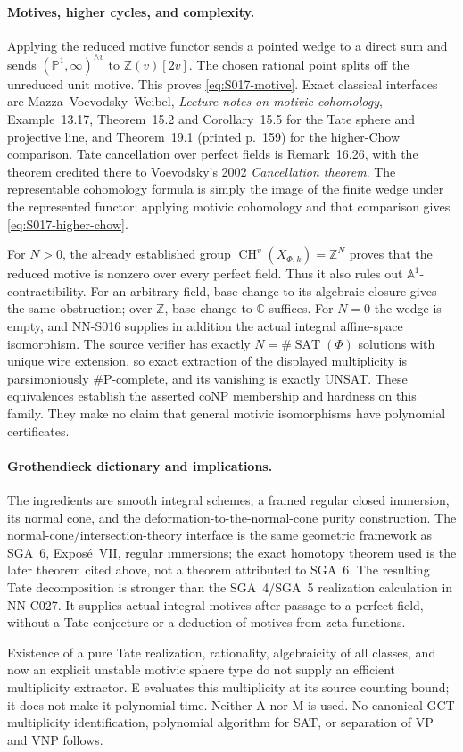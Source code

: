 \paragraph{Motives, higher cycles, and complexity.}
Applying the reduced motive functor sends a pointed wedge to a direct
sum and sends $(\mathbb P^1,\infty)^{\wedge v}$ to
$\mathbb Z(v)[2v]$. The chosen rational point splits off the unreduced
unit motive. This proves \eqref{eq:S017-motive}. Exact classical
interfaces are Mazza--Voevodsky--Weibel, \emph{Lecture notes on motivic
cohomology}, Example~13.17, Theorem~15.2 and Corollary~15.5 for the
Tate sphere and projective line, and Theorem~19.1 (printed p.~159) for
the higher-Chow comparison. Tate cancellation over perfect fields is
Remark~16.26, with the theorem credited there to Voevodsky's 2002
\emph{Cancellation theorem}. The representable cohomology formula is
simply the image of the finite wedge under the represented functor;
applying motivic cohomology and that comparison gives
\eqref{eq:S017-higher-chow}.

For $N>0$, the already established group
$\operatorname{CH}^v(X_{\Phi,k})=\mathbb Z^N$ proves that the reduced
motive is nonzero over every perfect field. Thus it also rules out
$\mathbb A^1$-contractibility. For an arbitrary field, base change to
its algebraic closure gives the same obstruction; over $\mathbb Z$,
base change to $\mathbb C$ suffices. For $N=0$ the wedge is empty, and
NN-S016 supplies in addition the actual integral affine-space
isomorphism. The source verifier has exactly $N=\#\operatorname{SAT}(\Phi)$
solutions with unique wire extension, so exact extraction of the
displayed multiplicity is parsimoniously \#P-complete, and its
vanishing is exactly UNSAT. These equivalences establish the asserted
coNP membership and hardness on this family. They make no claim that
general motivic isomorphisms have polynomial certificates.

\paragraph{Grothendieck dictionary and implications.}
The ingredients are smooth integral schemes, a framed regular closed
immersion, its normal cone, and the deformation-to-the-normal-cone
purity construction. The normal-cone/intersection-theory interface is
the same geometric framework as SGA~6, Expos\'e~VII, regular immersions;
the exact homotopy theorem used is the later theorem cited above, not
a theorem attributed to SGA~6. The resulting Tate decomposition is
stronger than the SGA~4/SGA~5 realization calculation in NN-C027.
It supplies actual integral motives after passage to a perfect field,
without a Tate conjecture or a deduction of motives from zeta functions.

Existence of a pure Tate realization, rationality, algebraicity of all
classes, and now an explicit unstable motivic sphere type do not supply
an efficient multiplicity extractor. E evaluates this multiplicity at
its source counting bound; it does not make it polynomial-time.
Neither A nor M is used. No canonical GCT multiplicity identification,
polynomial algorithm for SAT, or separation of VP and VNP follows.

